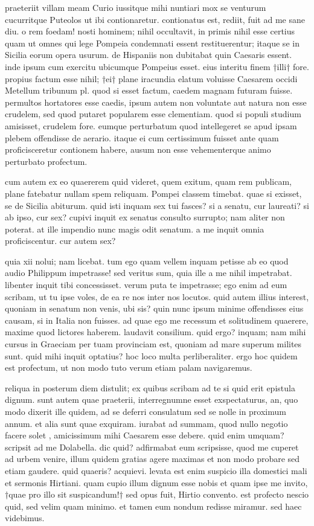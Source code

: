  praeteriit villam meam Curio iussitque mihi nuntiari mox se venturum cucurritque Puteolos ut ibi contionaretur. contionatus est, rediit, fuit ad me sane diu. o rem foedam! nosti hominem; nihil occultavit, in primis nihil esse certius quam ut omnes qui lege Pompeia condemnati essent restituerentur; itaque se in Sicilia eorum opera usurum. de Hispaniis non dubitabat quin Caesaris essent. inde ipsum cum exercitu ubicumque Pompeius esset. eius interitu finem †illi† fore. propius factum esse nihil; †ei† plane iracundia elatum voluisse Caesarem occidi Metellum tribunum pl. quod si esset factum, caedem magnam futuram fuisse. permultos hortatores esse caedis, ipsum autem non voluntate aut natura non esse crudelem, sed quod putaret popularem esse clementiam. quod si populi studium amisisset, crudelem fore. eumque perturbatum quod intellegeret se apud ipsam plebem offendisse de aerario. itaque ei cum certissimum fuisset ante quam proficisceretur contionem habere, ausum non esse vehementerque animo perturbato profectum.

 cum autem ex eo quaererem quid videret, quem exitum, quam rem publicam, plane fatebatur nullam spem reliquam. Pompei classem timebat. quae si exisset, se de Sicilia abiturum. quid isti inquam sex tui fasces? si a senatu, cur laureati? si ab ipso, cur sex? cupivi inquit ex senatus consulto surrupto; nam aliter non poterat. at ille impendio nunc magis odit senatum. a me inquit omnia proficiscentur. cur autem sex?

 quia xii nolui; nam licebat. tum ego quam vellem inquam petisse ab eo quod audio Philippum impetrasse! sed veritus sum, quia ille a me nihil impetrabat. libenter inquit tibi concessisset. verum puta te impetrasse; ego enim ad eum scribam, ut tu ipse voles, de ea re nos inter nos locutos. quid autem illius interest, quoniam in senatum non venis, ubi sis? quin nunc ipsum minime offendisses eius causam, si in Italia non fuisses. ad quae ego me recessum et solitudinem quaerere, maxime quod lictores haberem. laudavit consilium. quid ergo? inquam; nam mihi cursus in Graeciam per tuam provinciam est, quoniam ad mare superum milites sunt. quid mihi inquit optatius? hoc loco multa perliberaliter. ergo hoc quidem est profectum, ut non modo tuto verum etiam palam navigaremus.

 reliqua in posterum diem distulit; ex quibus scribam ad te si quid erit epistula dignum. sunt autem quae praeterii, interregnumne esset exspectaturus, an, quo modo dixerit ille quidem, ad se deferri consulatum sed se nolle in proximum annum. et alia sunt quae exquiram. iurabat ad summam, quod nullo negotio facere solet , amicissimum mihi Caesarem esse debere. quid enim umquam? scripsit ad me Dolabella. dic quid? adfirmabat eum scripsisse, quod me cuperet ad urbem venire, illum quidem gratias agere maximas et non modo probare sed etiam gaudere. quid quaeris? acquievi. levata est enim suspicio illa domestici mali et sermonis Hirtiani. quam cupio illum dignum esse nobis et quam ipse me invito, †quae pro illo sit suspicandum!† sed opus fuit, Hirtio convento. est profecto nescio quid, sed velim quam minimo. et tamen eum nondum redisse miramur. sed haec videbimus.

